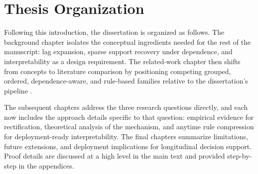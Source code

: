 \section{Thesis Organization}
Following this introduction, the dissertation is organized as follows. The background chapter isolates the conceptual ingredients needed for the rest of the manuscript: lag expansion, sparse support recovery under dependence, and interpretability as a design requirement. The related-work chapter then shifts from concepts to literature comparison by positioning competing grouped, ordered, dependence-aware, and rule-based families relative to the dissertation's pipeline \autocites{fried2010,tay2023,yang2015}.

The subsequent chapters address the three research questions directly, and each now includes the approach details specific to that question: empirical evidence for rectification, theoretical analysis of the mechanism, and anytime rule compression for deployment-ready interpretability. The final chapters summarize limitations, future extensions, and deployment implications for longitudinal decision support. Proof details are discussed at a high level in the main text and provided step-by-step in the appendices.

